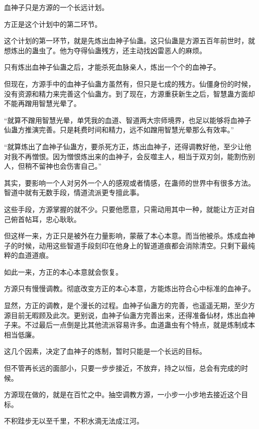 
\begin{this_body}

血神子只是方源的一个长远计划。

方正是这个计划中的第二环节。

这个计划的第一环节，就是先炼出血神子仙蛊。这只仙蛊是方源五百年前世时，就想炼出的蛊虫了。他为夺得仙蛊残方，还主动找凶雷恶人的麻烦。

只有炼出血神子仙蛊之后，才能杀死血脉亲人，炼出一个个的血神子。

但现在，方源手中的血神子仙蛊方虽然有，但只是七成的残方。仙僵身份的时候，没有资源和精力来完善这个仙蛊方。到了现在，方源重获新生之后，智慧蛊方面却不能再蹭用智慧光晕了。

“就算不蹭用智慧光晕，单凭我的血道、智道两大宗师境界，也足以能够将血神子仙蛊方推演完善。只是耗费时间和精力，远不如蹭用智慧光晕那么有效率。”

“就算炼出了血神子仙蛊方，要杀死方正，炼出血神子，还得调教好他，至少让他对我不再憎恨。因为憎恨炼出来的血神子，会反噬主人，相当于双刃剑，能割伤别人，但稍不留神也会伤害自己。”

其实，要影响一个人对另外一个人的感观或者情感，在蛊师的世界中有很多方法。智道中就有无数手段，情道流派更专擅此事。

这些手段，方源掌握的就不少。只要他愿意，只需动用其中一种，就能让方正对自己俯首帖耳，忠心耿耿。

但这样一来，方正只是被外在力量影响，蒙蔽了本心本意。而当他被杀。炼成血神子的时候，动用这些智道手段刻印在他身上的智道道痕都会消除清空。只剩下最纯粹的血道道痕。

如此一来，方正的本心本意就会恢复。

方源只有慢慢调教。彻底改变方正的本心本意，方能炼出符合心中标准的血神子。

显然，方正的调教，是个漫长的过程。血神子仙蛊方的完善，也遥遥无期，至少方源目前无暇顾及此次。更别说，血神子仙蛊方完善出来，还得准备仙材，炼出血神子来。不过最后一点倒是比其他流派容易许多。血道蛊虫有个特点，就是炼制成本相当低廉。

这几个因素，决定了血神子的炼制，暂时只能是一个长远的目标。

但不管再长远的面部小，只要一步步接近，不放弃，持之以恒，总会有完成的时候。

方源现在做的，就是在百忙之中。抽空调教方源，一小步一小步地去接近这个目标。

不积跬步无以至千里，不积水滴无法成江河。


\end{this_body}
